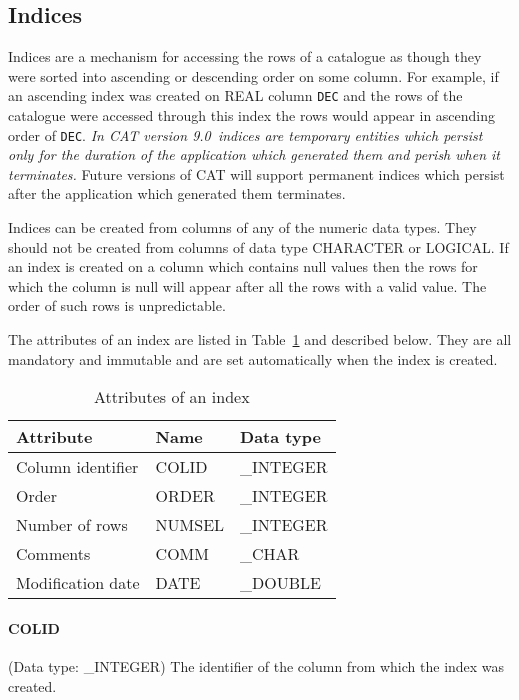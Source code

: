 \documentclass[11pt,twoside]{starlink}
\providecommand{\CATversion}{9.0~}
\begin{document}
\subsection{Indices}

Indices are a mechanism for accessing the rows of a catalogue as though
they were sorted into ascending or descending order on some column.  For
example, if an ascending index was created on REAL column \texttt{DEC} and
the rows of the catalogue were accessed through this index the rows
would appear in ascending order of \texttt{DEC}. \textit{In CAT version
\CATversion indices are temporary entities which persist only for the
duration of the application which generated them and perish when it
terminates.} Future versions of CAT will support permanent indices which
persist after the application which generated them terminates.

Indices can be created from columns of any of the numeric data types.
They should not be created from columns of data type CHARACTER or
LOGICAL. If an index is created on a column which contains null values
then the rows for which the column is null will appear after all the
rows with a valid value. The order of such rows is unpredictable.

The attributes of an index are listed in Table~\ref{INDEX_ATT} and
described below. They are all mandatory and immutable and are set
automatically when the index is created.

\begin{table}[htbp]

\begin{center}
\begin{tabular}{lll}
Attribute         & Name    & Data type  \\ \hline
Column identifier & COLID   & \_INTEGER  \\
Order             & ORDER   & \_INTEGER  \\
Number of rows    & NUMSEL  & \_INTEGER  \\
Comments          & COMM    & \_CHAR     \\
Modification date & DATE    & \_DOUBLE   \\
\end{tabular}
\end{center}

\caption{\label{INDEX_ATT}Attributes of an index}

\end{table}

\paragraph{COLID}
(Data type: \_INTEGER)
The identifier of the column from which the index was created.
\end{document}

